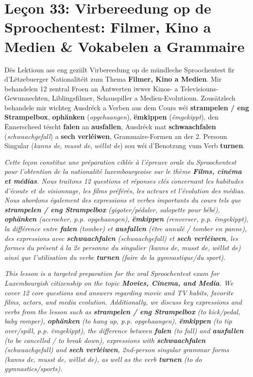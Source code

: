 \chapter[Leçon 33: Filmer, Kino a Medien]{Leçon 33: Virbereedung op de Sproochentest: Filmer, Kino a Medien \& Vokabelen a Grammaire}

Dës Lektioun ass eng geziilt Virbereedung op de mündleche Sproochentest fir d'Lëtzebuerger Nationalitéit zum Thema \textbf{Filmer, Kino a Medien}. Mir behandelen 12 zentral Froen an Äntwerten iwwer Kinos- a Televisiouns-Gewunnechten, Liblingsfilmer, Schauspiller a Medien-Evolutioun. Zousätzlech behandele mir wichteg Ausdréck a Verben aus dem Cours wéi \textbf{strampelen / eng Strampelbox}, \textbf{ophänken} (\textit{opgehaangen}), \textbf{ëmkippen} (\textit{ëmgekippt}), den Ënnerscheed tëscht \textbf{falen} an \textbf{ausfallen}, Ausdréck mat \textbf{schwaachfalen} (\textit{schwaachgefall}) a \textbf{sech verléiwen}, Grammaire-Formen an der 2. Persoun Singular (\textit{kanns de}, \textit{musst de}, \textit{wëllst de}) sou wéi d'Benotzung vum Verb \textbf{turnen}.

\textit{Cette leçon constitue une préparation ciblée à l'épreuve orale du Sproochentest pour l'obtention de la nationalité luxembourgeoise sur le thème \textbf{Films, cinéma et médias}. Nous traitons 12 questions et réponses clés concernant les habitudes d'écoute et de visionnage, les films préférés, les acteurs et l'évolution des médias. Nous abordons également des expressions et verbes importants du cours tels que \textbf{strampelen / eng Strampelbox} (gigoter/pédaler, salopette pour bébé), \textbf{ophänken} (accrocher, p.p. \textit{opgehaangen}), \textbf{ëmkippen} (renverser, p.p. \textit{ëmgekippt}), la différence entre \textbf{falen} (tomber) et \textbf{ausfallen} (être annulé / tomber en panne), des expressions avec \textbf{schwaachfalen} (\textit{schwaachgefall}) et \textbf{sech verléiwen}, les formes du présent à la 2e personne du singulier (\textit{kanns de}, \textit{musst de}, \textit{wëllst de}) ainsi que l'utilisation du verbe \textbf{turnen} (faire de la gymnastique/du sport).}

\textit{This lesson is a targeted preparation for the oral Sproochentest exam for Luxembourgish citizenship on the topic \textbf{Movies, Cinema, and Media}. We cover 12 core questions and answers regarding movie and TV habits, favorite films, actors, and media evolution. Additionally, we discuss key expressions and verbs from the lesson such as \textbf{strampelen / eng Strampelbox} (to kick/pedal, baby romper), \textbf{ophänken} (to hang up, p.p. \textit{opgehaangen}), \textbf{ëmkippen} (to tip over/spill, p.p. \textit{ëmgekippt}), the difference between \textbf{falen} (to fall) and \textbf{ausfallen} (to be cancelled / to break down), expressions with \textbf{schwaachfalen} (\textit{schwaachgefall}) and \textbf{sech verléiwen}, 2nd-person singular grammar forms (\textit{kanns de}, \textit{musst de}, \textit{wëllst de}), as well as the verb \textbf{turnen} (to do gymnastics/sports).}

